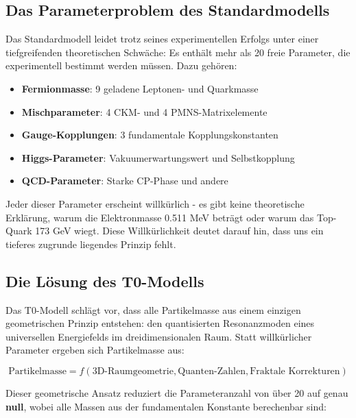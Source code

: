 \documentclass[12pt,a4paper]{article}
\begin{document}
	\subsection{Das Parameterproblem des Standardmodells}
	\label{subsec:parameter_problem}
	
	Das Standardmodell leidet trotz seines experimentellen Erfolgs unter einer tiefgreifenden theoretischen Schw\"a{}che: Es enth\"a{}lt mehr als 20 freie Parameter, die experimentell bestimmt werden m\"u{}ssen. Dazu geh\"o{}ren:
	
	\begin{itemize}
		\item \textbf{Fermionmasse}: 9 geladene Leptonen- und Quarkmasse
		\item \textbf{Mischparameter}: 4 CKM- und 4 PMNS-Matrixelemente
		\item \textbf{Gauge-Kopplungen}: 3 fundamentale Kopplungskonstanten
		\item \textbf{Higgs-Parameter}: Vakuumerwartungswert und Selbstkopplung
		\item \textbf{QCD-Parameter}: Starke CP-Phase und andere
	\end{itemize}
	
	Jeder dieser Parameter erscheint willk\"u{}rlich - es gibt keine theoretische Erkl\"a{}rung, warum die Elektronmasse 0.511 MeV betr\"a{}gt oder warum das Top-Quark 173 GeV wiegt. Diese Willk\"u{}rlichkeit deutet darauf hin, dass uns ein tieferes zugrunde liegendes Prinzip fehlt.
	
	\subsection{Die L\"o{}sung des T0-Modells}
	\label{subsec:t0_solution}
	
	Das T0-Modell schl\"a{}gt vor, dass alle Partikelmasse aus einem einzigen geometrischen Prinzip entstehen: den quantisierten Resonanzmoden eines universellen Energiefelds im dreidimensionalen Raum. Statt willk\"u{}rlicher Parameter ergeben sich Partikelmasse aus:
	
	\begin{equation}
		\text{Partikelmasse} = f(\text{3D-Raumgeometrie}, \text{Quanten-Zahlen}, \text{Fraktale Korrekturen})
		\label{eq:t0_principle}
	\end{equation}
	
	Dieser geometrische Ansatz reduziert die Parameteranzahl von \"u{}ber 20 auf genau \textbf{null}, wobei alle Massen aus der fundamentalen Konstante berechenbar sind:
	
\end{document}
